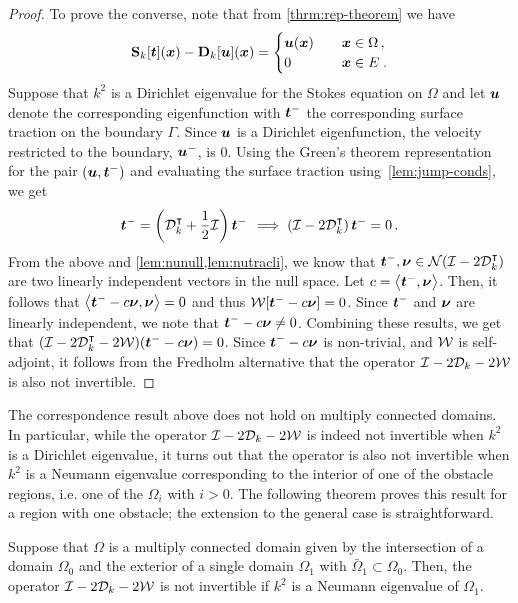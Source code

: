 \begin{proof}
To prove the converse, note that from \cref{thrm:rep-theorem} we have 
  \begin{equation} 
    {\bf S}_{k} [{\boldsymbol t}]({\boldsymbol x}) - {\bf D}_{k}[{\boldsymbol u}]({\boldsymbol x}) = \begin{cases} 
    {\boldsymbol u}({\boldsymbol x}) &\quad {\boldsymbol x} \in \Omega \, , \\
    0 &\quad {\boldsymbol x} \in E \; .
    \end{cases}
  \end{equation}
  Suppose that $k^2$ is a Dirichlet eigenvalue for the Stokes equation
  on $\Omega$ and let ${\boldsymbol u}$ denote the corresponding eigenfunction
  with ${\boldsymbol t}^{-}$ the corresponding surface traction on the
  boundary $\Gamma$.
  Since ${\boldsymbol u}$ is a Dirichlet eigenfunction, the velocity restricted
  to the boundary, ${\boldsymbol u}^{-}$, is $0$. 
  Using the Green's theorem representation for the pair
  $({\boldsymbol u},{\boldsymbol t}^{-})$ and evaluating the surface traction
  using~\cref{lem:jump-conds}, we get
  \begin{equation}
    {\boldsymbol t}^{-} = \left({\mathcal D}^{\intercal}_{k} + \frac{1}{2} \mathcal I\right) {\boldsymbol t}^{-} \,
    \implies \left(\mathcal I - 2{\mathcal D}^{\intercal}_{k} \right) 
    {\boldsymbol t}^{-} = 0 \, .
  \end{equation}
  From the above and \cref{lem:nunull,lem:nutracli},
  we know that ${\boldsymbol t}^{-}, {\boldsymbol \nu} \in {\mathcal N}(\mathcal I - 2{\mathcal D}^{\intercal}_{k})$
  are two linearly independent vectors in the null space.
  Let $c = \left< {\boldsymbol t}^{-},{\boldsymbol \nu} \right>$. Then, it
  follows that $\left<{\boldsymbol t}^{-} -c {\boldsymbol \nu}, {\boldsymbol \nu} \right> = 0$
  and thus ${\mathcal W}[{\boldsymbol t}^{-} - c{\boldsymbol \nu}] = 0$. 
  Since ${\boldsymbol t}^{-}$ and ${\boldsymbol \nu}$ are linearly independent, we note that
  ${\boldsymbol t}^{-} -c{\boldsymbol \nu} \neq 0$. Combining these results, we get that
  $(\mathcal I - 2{\mathcal D}^{\intercal}_{k} - 2{\mathcal W}) ({\boldsymbol t}^{-} - c{\boldsymbol \nu}) = 0$. 
  Since ${\boldsymbol t}^{-}-c{\boldsymbol \nu}$ is non-trivial, and ${\mathcal W}$ is
  self-adjoint, it follows from the Fredholm alternative
  that the operator $\mathcal I - 2{\mathcal D}_{k} - 2{\mathcal W}$ is also not
  invertible.
\end{proof}

The correspondence result above does not hold on multiply
connected domains.
In particular, while the operator $\mathcal I -2{\mathcal D}_{k} -2{\mathcal W}$ 
is indeed not invertible when $k^2$ is a Dirichlet eigenvalue,
it turns out that the operator is also not
invertible when $k^2$ is a Neumann eigenvalue
corresponding to the interior of one of the obstacle regions,
i.e. one of the $\Omega_{i}$ with $i > 0$. The following theorem
proves this result for a region with one obstacle;
the extension to the general case is straightforward.

\begin{thrm}
  Suppose that $\Omega$ is a multiply connected domain
  given by the intersection of a domain $\Omega_{0}$
  and the exterior of a single domain $\Omega_{1}$ with
  $ \bar\Omega_1 \subset \Omega_0$.
  Then, the operator $\mathcal I - 2{\mathcal D}_{k} - 2{\mathcal W}$ is not invertible
  if $k^2$ is a Neumann eigenvalue of $\Omega_{1}$.
\end{thrm}

